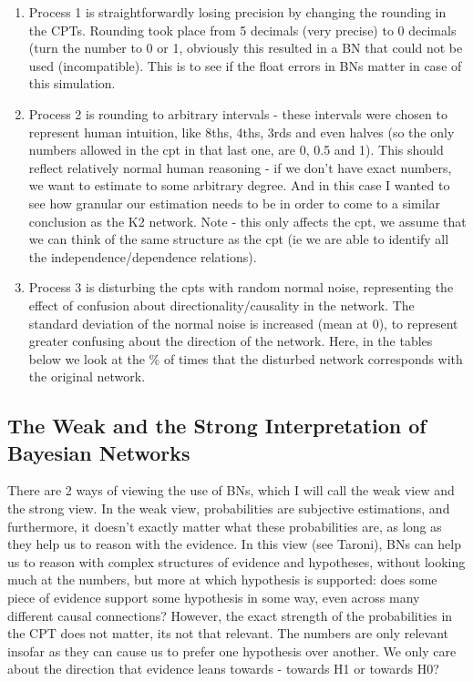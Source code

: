 \documentclass[11pt]{amsart}
\begin{document}
\begin{enumerate}

\item Process 1 is straightforwardly losing precision by changing the rounding in the CPTs. Rounding took place from 5 decimals (very precise) to 0 decimals (turn the number to 0 or 1, obviously this resulted in a BN that could not be used (incompatible). This is to see if the float errors in BNs matter in case of this simulation.

\item Process 2 is rounding to arbitrary intervals - these intervals were chosen to represent human intuition, like 8ths, 4ths, 3rds and even halves (so the only numbers allowed in the cpt in that last one, are 0, 0.5 and 1). This should reflect relatively normal human reasoning - if we don't have exact numbers, we want to estimate to some arbitrary degree. And in this case I wanted to see how granular our estimation needs to be in order to come to a similar conclusion as the K2 network. Note - this only affects the cpt, we assume that we can think of the same structure as the cpt (ie we are able to identify all the independence/dependence relations).

\item Process 3 is disturbing the cpts with random normal noise, representing the effect of confusion about directionality/causality in the network. The standard deviation of the normal noise is increased (mean at 0), to represent greater confusing about the direction of the network. Here, in the tables below we look at the \% of times that the disturbed network corresponds with the original network.
\end{enumerate}

\subsection{The Weak and the Strong Interpretation of Bayesian Networks}
There are 2 ways of viewing the use of BNs, which I will call the weak view and the strong view. In the weak view, probabilities are subjective estimations, and furthermore, it doesn't exactly matter what these probabilities are, as long as they help us to reason with the evidence. In this view (see Taroni), BNs can help us to reason with complex structures of evidence and hypotheses, without looking much at the numbers, but more at which hypothesis is supported: does some piece of evidence support some hypothesis in some way, even across many different causal connections? However, the exact strength of the probabilities in the CPT does not matter, its not that relevant. The numbers are only relevant insofar as they can cause us to prefer one hypothesis over another. We only care about the direction that evidence leans towards - towards H1 or towards H0?
\end{document}
